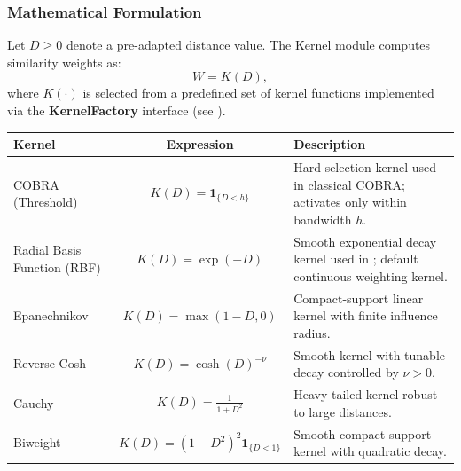 \subsubsection*{Mathematical Formulation}

Let $D \ge 0$ denote a pre-adapted distance value. The Kernel module computes similarity weights as:
\[
    W = K(D),
\]
where $K(\cdot)$ is selected from a predefined set of kernel functions implemented via the \textbf{KernelFactory} interface (see ).

\begin{table}[H]
    \centering
    \renewcommand{\arraystretch}{1.4}
    \setlength{\extrarowheight}{2pt}
    \begin{tabularx}{\textwidth}{|l|c|X|}
        \hline
        \textbf{Kernel}                             & \textbf{Expression} & \textbf{Description}       \\
        \hline

        COBRA (Threshold)                           &
        $K(D) = \mathbf{1}_{\{D < h\}}$             &
        Hard selection kernel used in classical COBRA; activates only within bandwidth $h$.            \\
        \hline

        Radial Basis Function (RBF)                 &
        $K(D) = \exp(-D)$                           &
        Smooth exponential decay kernel used in \GradientCOBRA{}; default continuous weighting kernel. \\
        \hline

        Epanechnikov                                &
        $K(D) = \max(1 - D, 0)$                     &
        Compact-support linear kernel with finite influence radius.                                    \\
        \hline

        Reverse Cosh                                &
        $K(D) = \cosh(D)^{-\nu}$                    &
        Smooth kernel with tunable decay controlled by $\nu > 0$.                                      \\
        \hline

        Cauchy                                      &
        $K(D) = \frac{1}{1 + D^2}$                  &
        Heavy-tailed kernel robust to large distances.                                                 \\
        \hline

        Biweight                                    &
        $K(D) = (1 - D^2)^2 \mathbf{1}_{\{D < 1\}}$ &
        Smooth compact-support kernel with quadratic decay.                                            \\
        \hline


\end{tabularx}
\end{table}
